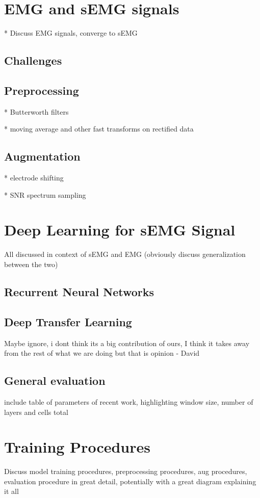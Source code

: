 \documentclass{llncs}
\begin{document}
\section{EMG and sEMG signals}

* Discuss EMG signals, converge to sEMG

\subsection{Challenges}

\subsection{Preprocessing}

* Butterworth filters

* moving average and other fast transforms on rectified data


\subsection{Augmentation}

* electrode shifting

* SNR spectrum sampling


\section{Deep Learning for sEMG Signal}

All discussed in context of sEMG and EMG (obviously discuss generalization between the two)
 \subsection{Recurrent Neural Networks}

 \cite{rnn_fun}


 \subsection{Deep Transfer Learning}
 Maybe ignore, i dont think its a big contribution of ours, I think it takes away from the rest of what we are doing but that is opinion - David
 \subsection{General evaluation}
 include table of parameters of recent work, highlighting window size, number of layers and cells total
\section{Training Procedures}
Discuss model training procedures, preprocessing procedures, aug procedures, evaluation procedure in great detail, potentially with a great diagram explaining it all
\end{document}
